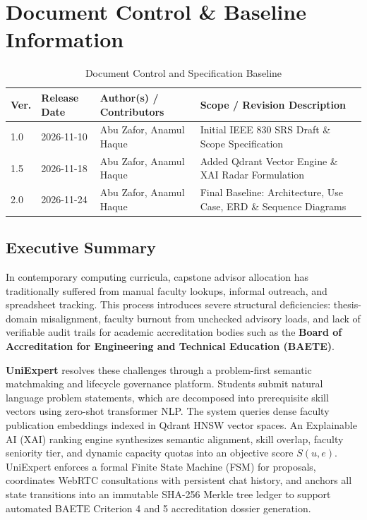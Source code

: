\documentclass[10.5pt,a4paper]{article}
\begin{document}
\clearpage

\section*{Document Control \& Baseline Information}

\begin{table}[h]
\centering
\small
\begin{tabularx}{\linewidth}{|l|l|X|l|}
\hline
\rowcolor{headergray} \textbf{Ver.} & \textbf{Release Date} & \textbf{Author(s) / Contributors} & \textbf{Scope / Revision Description} \\ \hline
1.0 & 2026-11-10 & Abu Zafor, Anamul Haque & Initial IEEE 830 SRS Draft \& Scope Specification \\ \hline
1.5 & 2026-11-18 & Abu Zafor, Anamul Haque & Added Qdrant Vector Engine \& XAI Radar Formulation \\ \hline
2.0 & 2026-11-24 & Abu Zafor, Anamul Haque & Final Baseline: Architecture, Use Case, ERD \& Sequence Diagrams \\ \hline
\end{tabularx}
\caption{Document Control and Specification Baseline}
\end{table}

\subsection*{Executive Summary}
In contemporary computing curricula, capstone advisor allocation has traditionally suffered from manual faculty lookups, informal outreach, and spreadsheet tracking. This process introduces severe structural deficiencies: thesis-domain misalignment, faculty burnout from unchecked advisory loads, and lack of verifiable audit trails for academic accreditation bodies such as the \textbf{Board of Accreditation for Engineering and Technical Education (BAETE)}.

\textbf{UniExpert} resolves these challenges through a problem-first semantic matchmaking and lifecycle governance platform. Students submit natural language problem statements, which are decomposed into prerequisite skill vectors using zero-shot transformer NLP. The system queries dense faculty publication embeddings indexed in Qdrant HNSW vector spaces. An Explainable AI (XAI) ranking engine synthesizes semantic alignment, skill overlap, faculty seniority tier, and dynamic capacity quotas into an objective score $S(u,e)$. UniExpert enforces a formal Finite State Machine (FSM) for proposals, coordinates WebRTC consultations with persistent chat history, and anchors all state transitions into an immutable SHA-256 Merkle tree ledger to support automated BAETE Criterion 4 and 5 accreditation dossier generation.
\end{document}
